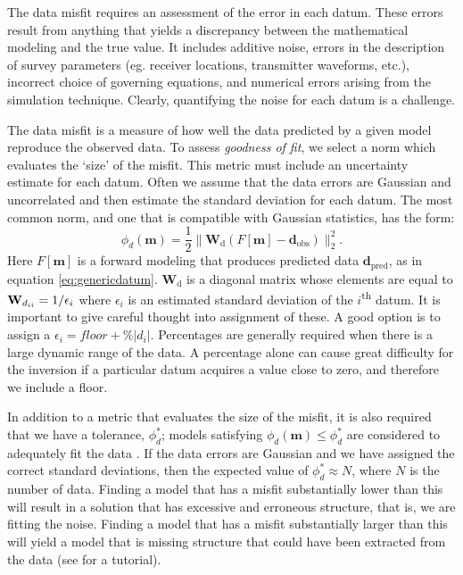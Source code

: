 \documentclass[preprint,review,3p,times,onecolumn,authoryear]{elsarticle}
\newcommand{\dobs}{\mathbf{d}_\text{obs}}
\newcommand{\m}{\mathbf{m}}
\newcommand{\dpred}{\mathbf{d}_\text{pred}}
\newcommand{\Wd}{\mathbf{W}_\text{d}}
\begin{document}
\bigskip

The data misfit requires an assessment of the
error in each datum. These errors result from anything that yields a discrepancy between the
mathematical modeling and the true value. It includes additive noise, errors in the description of survey parameters (eg. receiver locations, transmitter waveforms, etc.),
incorrect choice of governing equations, and numerical
errors arising from the simulation technique. Clearly, quantifying the noise
for each datum is a challenge.

The data misfit is a measure of how well the data predicted by a given
model reproduce the observed data. To assess \emph{goodness of fit}, we select a norm which evaluates the `size' of the misfit. This metric must include an uncertainty estimate for each datum. Often we assume that the data errors are Gaussian and uncorrelated and then estimate the standard deviation for each datum. The most common norm, and one that is compatible with Gaussian statistics, has the form:
{%
\begin{equation}
\label{eq:phid}
  \phi_d(\m) = \frac{1}{2}\|\Wd (F[\m] - \dobs) \|^2_2.
\end{equation}
}
Here $F[\m]$ is a forward modeling that produces predicted data $\dpred$, as in equation \ref{eq:genericdatum}.
$\Wd$ is a diagonal matrix whose elements are equal to ${\bf W}_{d_{ii}}=1/\epsilon_i$ where
$\epsilon_i$ is an estimated standard deviation of the $i$\textsuperscript{th} datum. It is
important to give careful thought into assignment of these. A good
option is to assign a $\epsilon_i = floor + \%|d_i|$.
Percentages are generally required when there is a large dynamic
range of the data. A percentage alone can cause great difficulty
for the inversion if a particular datum acquires a value close to zero, and therefore we include a floor.

In addition to a metric that evaluates the size of the misfit, it is also
required that we have a tolerance, $\phi_d^*$; models satisfying $\phi_d(\mathbf{m}) \leq \phi_d^*$ are considered to adequately fit the data \citep{parker1994geophysical}. If the data errors are Gaussian and
we have assigned the correct standard deviations, then the expected value of
$\phi_d^* \approx N$, where $N$ is the number of data. Finding a model that has a misfit
substantially lower than this will result in a solution that has excessive
and erroneous structure, that is, we are fitting the noise. Finding a model that has
a misfit substantially larger than this will yield a model that is
missing structure that could have been extracted from the data (see \cite{DougTutorial} for a tutorial).
\end{document}
